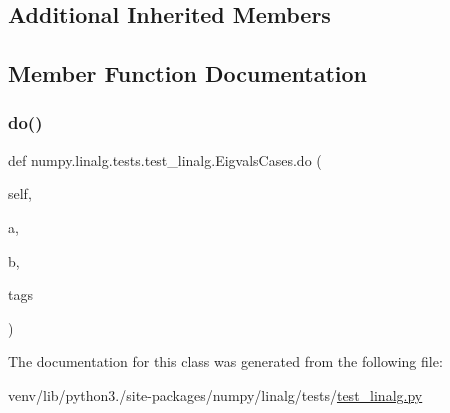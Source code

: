 \subsection*{Additional Inherited Members}


\subsection{Member Function Documentation}
\mbox{\label{classnumpy_1_1linalg_1_1tests_1_1test__linalg_1_1EigvalsCases_a3a6e45fc25771ebb5f9cd0cab31e4b73}} 
\subsubsection{\texorpdfstring{do()}{do()}}
{\footnotesize\ttfamily def numpy.\+linalg.\+tests.\+test\+\_\+linalg.\+Eigvals\+Cases.\+do (\begin{DoxyParamCaption}\item[{}]{self,  }\item[{}]{a,  }\item[{}]{b,  }\item[{}]{tags }\end{DoxyParamCaption})}



The documentation for this class was generated from the following file\+:\begin{DoxyCompactItemize}
\item 
venv/lib/python3./site-\/packages/numpy/linalg/tests/\hyperlink{test__linalg_8py}{test\+\_\+linalg.\+py}\end{DoxyCompactItemize}

